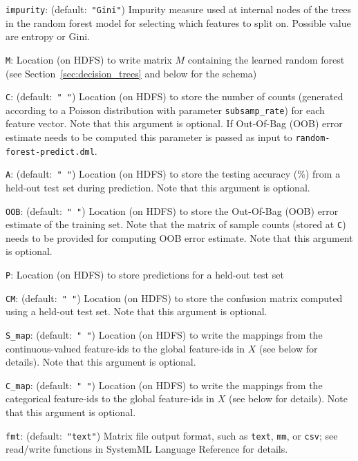 \begin{Description}
	\item[{\tt impurity}:] (default:\mbox{ }{\tt "Gini"})
	Impurity measure used at internal nodes of the trees in the random forest model for selecting which features to split on. Possible value are entropy or Gini.
	\item[{\tt M}:] 
	Location (on HDFS) to write matrix $M$ containing the learned random forest (see Section~\ref{sec:decision_trees} and below for the schema) 
	\item[{\tt C}:] (default:\mbox{ }{\tt " "})
	Location (on HDFS) to store the number of counts (generated according to a Poisson distribution with parameter {\tt subsamp\_rate}) for each feature vector. Note that this argument is optional. If Out-Of-Bag (OOB) error estimate needs to be computed this parameter is passed as input to {\tt random-forest-predict.dml}. 
	\item[{\tt A}:] (default:\mbox{ }{\tt " "})
	Location (on HDFS) to store the testing accuracy (\%) from a 
	held-out test set during prediction. Note that this argument is optional.
	\item[{\tt OOB}:] (default:\mbox{ }{\tt " "})
	Location (on HDFS) to store the Out-Of-Bag (OOB) error estimate of the training set. Note that the matrix of sample counts (stored at {\tt C}) needs to be provided for computing OOB error estimate. Note that this argument is optional.
	\item[{\tt P}:] 
	Location (on HDFS) to store predictions for a held-out test set
	\item[{\tt CM}:] (default:\mbox{ }{\tt " "})
	Location (on HDFS) to store the confusion matrix computed using a held-out test set. Note that this argument is optional.
	\item[{\tt S\_map}:] (default:\mbox{ }{\tt " "})
	Location (on HDFS) to write the mappings from the continuous-valued feature-ids to the global feature-ids in $X$ (see below for details). Note that this argument is optional.
	\item[{\tt C\_map}:] (default:\mbox{ }{\tt " "})
	Location (on HDFS) to write the mappings from the categorical feature-ids to the global feature-ids in $X$ (see below for details). Note that this argument is optional.
	\item[{\tt fmt}:] (default:\mbox{ }{\tt "text"})
	Matrix file output format, such as {\tt text}, {\tt mm}, or {\tt csv};
	see read/write functions in SystemML Language Reference for details.
\end{Description}


 \smallskip

